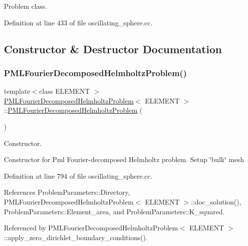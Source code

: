 Problem class. 

Definition at line 433 of file oscillating\+\_\+sphere.\+cc.



\subsection{Constructor \& Destructor Documentation}
\mbox{\label{classPMLFourierDecomposedHelmholtzProblem_a5764db8312a28a3e1eaac2cc61813f83}} 
\subsubsection{\texorpdfstring{P\+M\+L\+Fourier\+Decomposed\+Helmholtz\+Problem()}{PMLFourierDecomposedHelmholtzProblem()}}
{\footnotesize\ttfamily template$<$class E\+L\+E\+M\+E\+NT $>$ \\
\hyperlink{classPMLFourierDecomposedHelmholtzProblem}{P\+M\+L\+Fourier\+Decomposed\+Helmholtz\+Problem}$<$ E\+L\+E\+M\+E\+NT $>$\+::\hyperlink{classPMLFourierDecomposedHelmholtzProblem}{P\+M\+L\+Fourier\+Decomposed\+Helmholtz\+Problem} (\begin{DoxyParamCaption}{ }\end{DoxyParamCaption})}



Constructor. 

Constructor for Pml Fourier-\/decomposed Helmholtz problem. Setup \char`\"{}bulk\char`\"{} mesh 

Definition at line 794 of file oscillating\+\_\+sphere.\+cc.



References Problem\+Parameters\+::\+Directory, P\+M\+L\+Fourier\+Decomposed\+Helmholtz\+Problem$<$ E\+L\+E\+M\+E\+N\+T $>$\+::doc\+\_\+solution(), Problem\+Parameters\+::\+Element\+\_\+area, and Problem\+Parameters\+::\+K\+\_\+squared.



Referenced by P\+M\+L\+Fourier\+Decomposed\+Helmholtz\+Problem$<$ E\+L\+E\+M\+E\+N\+T $>$\+::apply\+\_\+zero\+\_\+dirichlet\+\_\+boundary\+\_\+conditions().

